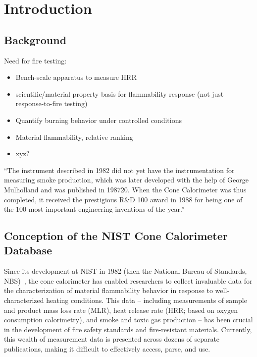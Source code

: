 
\section{Introduction} \label{sec:intro}
\subsection{Background} \label{ssec:intro-background}
Need for fire testing:
\begin{itemize}
\item Bench-scale apparatus to measure HRR
\item scientific/material property basis for flammability response (not just response-to-fire testing)
\item Quantify burning behavior under controlled conditions
\item Material flammability, relative ranking
\item xyz?
\end{itemize}

``The instrument described in 1982 did not yet have the instrumentation for measuring smoke production, which was later developed with the help of George Mulholland and was published in 198720. When the Cone Calorimeter was thus completed, it received the prestigious R\&D 100 award in 1988 for being one of the 100 most important engineering inventions of the year.''

\subsection{Conception of the NIST Cone Calorimeter Database} \label{ssec:intro-concept}
Since its development at NIST in 1982 (then the National Bureau of Standards, NBS)~\cite{babrauskas1982nbs}, the cone calorimeter has enabled researchers to collect invaluable data for the characterization of material flammability behavior in response to well-characterized heating conditions. This data – including measurements of sample and product mass loss rate (MLR), heat release rate (HRR; based on oxygen consumption calorimetry), and smoke and toxic gas production – has been crucial in the development of fire safety standards and fire-resistant materials. Currently, this wealth of measurement data is presented across dozens of separate publications, making it difficult to effectively access, parse, and use.

